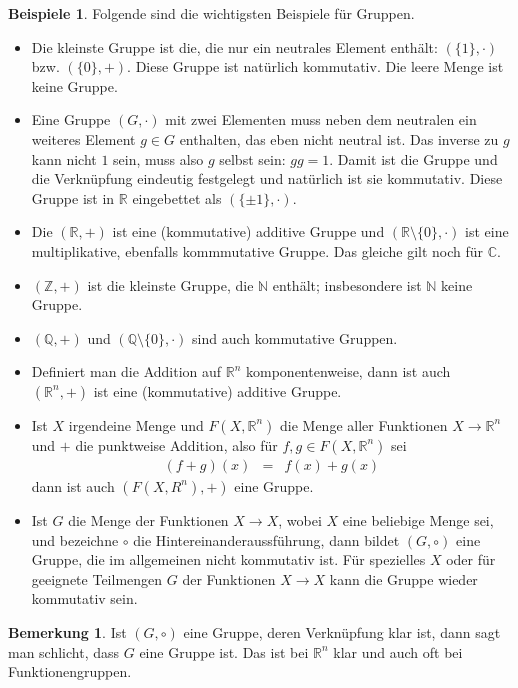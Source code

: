 \documentclass[index=totoc]{scrartcl}%
\theoremstyle{definition}
\newtheorem{bem}[defi]{Bemerkung}
\newtheorem{bspe}[defi]{Beispiele}
\newcommand{\N}{\mathbb N}
\newcommand{\Z}{\mathbb Z}
\newcommand{\Q}{\mathbb Q}
\newcommand{\R}{\mathbb R}
\newcommand{\C}{\mathbb C}
\begin{document}
\begin{bspe}
  Folgende sind die wichtigsten Beispiele für Gruppen. 
  \begin{itemize}
  \item
    Die kleinste Gruppe ist die, die nur ein neutrales Element enthält:
    $(\{1\}, \cdot)$ bzw. $(\{0\}, +)$.
    Diese Gruppe ist natürlich kommutativ.
    Die leere Menge ist keine Gruppe. 
  \item
    Eine Gruppe  $(G, \cdot)$ mit zwei Elementen muss neben dem neutralen
    ein weiteres Element $g\in G$ enthalten, das eben nicht neutral ist.
    Das inverse zu $g$ kann nicht $1$ sein, muss also $g$ selbst sein:
    $gg=1$.
    Damit ist die Gruppe und die Verknüpfung eindeutig festgelegt
    und natürlich ist sie kommutativ.
    Diese Gruppe ist in $\R$ eingebettet als $(\{\pm1\},\cdot)$. 
  \item
    Die $(\R,+)$ ist eine (kommutative) additive Gruppe und
    $(\R\setminus\{0\},\cdot)$ ist eine multiplikative,
    ebenfalls kommmutative Gruppe.
    Das gleiche gilt noch für $\C$.
  \item
    $(\Z,+)$ ist die kleinste Gruppe, die $\N$ enthält;
    insbesondere ist $\N$ keine Gruppe. 
  \item
    $(\Q,+)$ und $(\Q\setminus\{0\}, \cdot)$ sind auch kommutative Gruppen.
  \item
    Definiert man die Addition auf $\R^n$ komponentenweise,
    dann ist auch  $(\R^n,+)$ ist eine (kommutative) additive Gruppe. 
  \item
    Ist $X$ irgendeine Menge und
    $F(X,\R^n)$ die Menge aller Funktionen $X\to\R^n$
    und $+$ die punktweise Addition, also für $f,g\in F(X,\R^n)$ sei
    \begin{eqnarray*}
      (f+g)(x)&=&f(x)+g(x)
    \end{eqnarray*}
    dann ist auch $(F(X, R^n), +)$ eine Gruppe. 
  \item
    Ist $G$ die Menge der Funktionen $X\to X$,
    wobei $X$ eine beliebige Menge sei, und bezeichne $\circ$
    die Hintereinanderaussführung,
    dann bildet $(G, \circ)$ eine Gruppe,
    die im allgemeinen nicht kommutativ ist. 
    Für spezielles $X$ oder für geeignete Teilmengen $G$
    der Funktionen $X\to X$ kann die Gruppe wieder kommutativ sein. 
  \end{itemize}
\end{bspe}


\begin{bem}
  Ist $(G, \circ)$ eine Gruppe, deren Verknüpfung klar ist,
  dann sagt man schlicht, dass $G$ eine Gruppe ist.
  Das ist bei $\R^n$ klar und auch oft bei Funktionengruppen. 
\end{bem}
\end{document}
